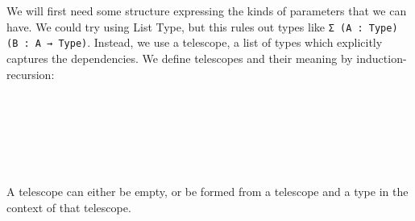 We will first need some structure expressing the kinds of parameters that we can have. We could try using List Type, but this rules out types like \texttt{Σ (A : Type) (B : A → Type)}. Instead, we use a telescope, a list of types which explicitly captures the dependencies. We define telescopes and their meaning by induction-recursion:
\begin{code}[hide]%
\>[0]\AgdaSpace{}%
\AgdaSpace{}%
\<%
\end{code}
\begin{code}%
\>[0][@{}l@{\AgdaIndent{1}}]%
\>[2]\AgdaSpace{}%
\AgdaSpace{}%
\AgdaSymbol{:}\AgdaSpace{}%
\<%
\\
%
\>[2]\AgdaSpace{}%
\AgdaSymbol{:}\AgdaSpace{}%
\AgdaSpace{}%
\AgdaSpace{}%
\<%
\\
\>[0]\<%
\\
%
\>[2]\AgdaSpace{}%
\AgdaSpace{}%
\<%
\\
\>[2][@{}l@{\AgdaIndent{0}}]%
\>[4]%
\>[9]\AgdaSymbol{:}\AgdaSpace{}%
\<%
\\
%
\>[4]%
\>[9]\AgdaSymbol{:}\AgdaSpace{}%
\AgdaSymbol{(}\AgdaSpace{}%
\AgdaSymbol{:}\AgdaSpace{}%
\AgdaSymbol{)}\AgdaSpace{}%
\AgdaSymbol{(}\AgdaSpace{}%
\AgdaSymbol{:}\AgdaSpace{}%
\AgdaSpace{}%
\AgdaSpace{}%
\AgdaSpace{}%
\AgdaSpace{}%
\AgdaSymbol{)}\AgdaSpace{}%
\AgdaSpace{}%
\<%
\end{code}
A telescope can either be empty, or be formed from a telescope and a type in the context of that telescope.


